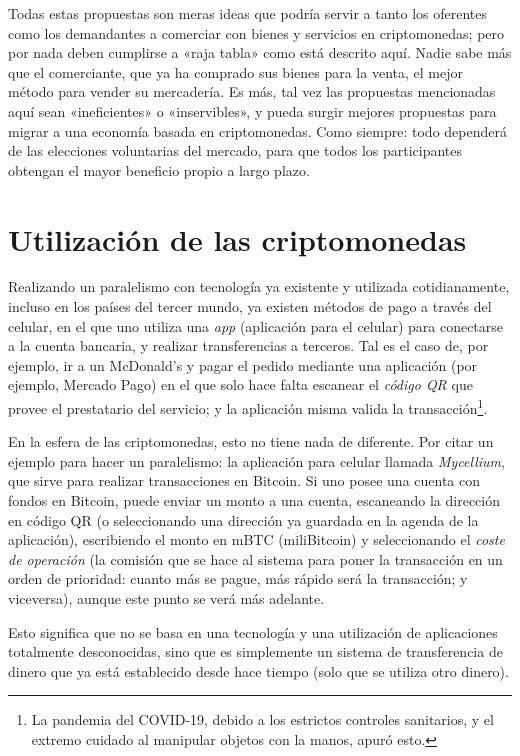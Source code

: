 \documentclass[12pt,a4paper,twoside]{book}
\begin{document}
Todas estas propuestas son meras ideas que podría servir a tanto los oferentes como los demandantes a comerciar con bienes y servicios en criptomonedas; pero por nada deben cumplirse a «raja tabla» como está descrito aquí. Nadie sabe más que el comerciante, que ya ha comprado sus bienes para la venta, el mejor método para vender su mercadería. Es más, tal vez las propuestas mencionadas aquí sean «ineficientes» o «inservibles», y pueda surgir mejores propuestas para migrar a una economía basada en criptomonedas. Como siempre: todo dependerá de las elecciones voluntarias del mercado, para que todos los participantes obtengan el mayor beneficio propio a largo plazo.

\section{Utilización de las criptomonedas}
Realizando un paralelismo con tecnología ya existente y utilizada cotidianamente, incluso en los países del tercer mundo, ya existen métodos de pago a través del celular, en el que uno utiliza una \textit{app} (aplicación para el celular) para conectarse a la cuenta bancaria, y realizar transferencias a terceros. Tal es el caso de, por ejemplo, ir a un McDonald's y pagar el pedido mediante una aplicación (por ejemplo, Mercado Pago) en el que solo hace falta escanear el \textit{código QR} que provee el prestatario del servicio; y la aplicación misma valida la transacción\footnote{La pandemia del COVID-19, debido a los estrictos controles sanitarios, y el extremo cuidado al manipular objetos con la manos, apuró esto.}.

En la esfera de las criptomonedas, esto no tiene nada de diferente. Por citar un ejemplo para hacer un paralelismo: la aplicación para celular llamada \textit{Mycellium}, que sirve para realizar transacciones en Bitcoin. Si uno posee una cuenta con fondos en Bitcoin, puede enviar un monto a una cuenta, escaneando la dirección en código QR (o seleccionando una dirección ya guardada en la agenda de la aplicación), escribiendo el monto en mBTC (miliBitcoin) y seleccionando el \textit{coste de operación} (la comisión que se hace al sistema para poner la transacción en un orden de prioridad: cuanto más se pague, más rápido será la transacción; y viceversa), aunque este punto se verá más adelante.

Esto significa que no se basa en una tecnología y una utilización de aplicaciones totalmente desconocidas, sino que es simplemente un sistema de transferencia de dinero que ya está establecido desde hace tiempo (solo que se utiliza otro dinero).
\end{document}
